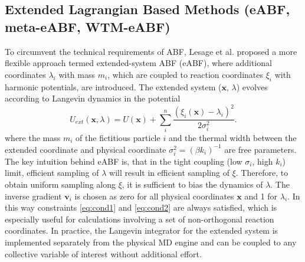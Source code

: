 \newpage
\subsection{Extended Lagrangian Based Methods (eABF, meta-eABF, WTM-eABF)}
\label{sec:eABF}
To circumvent the technical requirements of ABF, Lesage et al.\autocite{lesage2017smoothed} proposed a more flexible approach termed extended-system ABF (eABF), where additional coordinates $\lambda_i$ with mass $m_{i}$, which are coupled to reaction coordinates $\xi_i$ with harmonic potentials, are introduced. The extended system ($\textbf{x}$, $\lambda$) evolves according to Langevin dynamics in the potential
\begin{equation}
  U_{ext}(\textbf{x},\lambda) = U(\textbf{x}) + \sum_i^n \frac{(\xi_{i}(\textbf{x})-\lambda_i)^2}{2\sigma_i^2}.
\end{equation}
where the mass $m_i$ of the fictitious particle $i$ and the thermal width between the extended coordinate and physical coordinate $\sigma_i^2=(\beta k_i)^{-1}$ are free parameters.
The key intuition behind eABF is, that in the tight coupling (low $\sigma_i$, high $k_i$) limit, efficient sampling of $\lambda$ will result in efficient sampling of $\xi$.
Therefore, to obtain uniform sampling along $\xi$, it is sufficient to bias the dynamics of $\lambda$. The inverse gradient $\textbf{v}_i$ is chosen as zero for all physical coordinates $\textbf{x}$ and 1 for $\lambda_i$.
In this way constraints \ref{eq:cond1} and \ref{eq:cond2} are always satisfied, which is especially useful for calculations involving a set of non-orthogonal reaction coordinates.
In practice, the Langevin integrator for the extended system is implemented separately from the physical MD engine and can be coupled to any collective variable of interest without additional effort.

